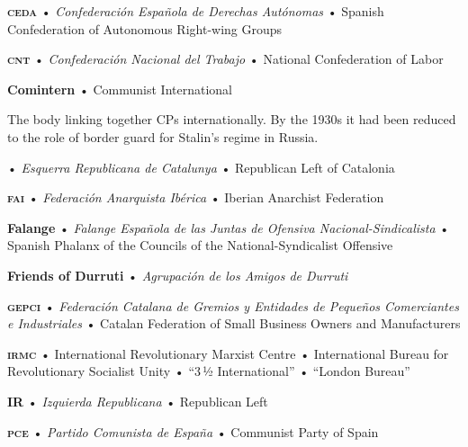 \begin{multicols}{2}
  \small
  \RaggedRight
  \setlength{\parskip}{0.25\baselineskip}
	
  \textbf{\textsc{ceda}} • \emph{Confederación Española de Derechas Autónomas} • Spanish Confederation of Autonomous Right-wing Groups
  
  \bigskip

  \textbf{\textsc{cnt}} • \emph{Confederación Nacional del Trabajo} • National Confederation of Labor

  \bigskip

  \textbf{Comintern} • Communist International

  The body linking together CPs internationally. By the 1930s it had been reduced to the role of border guard for Stalin’s regime in Russia.
  
  \bigskip

  \textbf{\ERC} • \emph{Esquerra Republicana de Catalunya} • Republican Left of Catalonia
  
  \bigskip
  
  \textbf{\textsc{fai}} • \emph{Federación Anarquista Ibérica} • Iberian Anarchist Federation
  
  \bigskip

  \textbf{Falange} • \emph{Falange Española de las Juntas de Ofensiva Nacional-Sindicalista} • Spanish Phalanx of the Councils of the National-Syndicalist Offensive
  
  \bigskip

  \textbf{Friends of Durruti} • \emph{Agrupación de los Amigos de Durruti}
  
  \bigskip

  \textbf{\textsc{gepci}} • \emph{Federación Catalana de Gremios y Entidades de Pequeños Comerciantes e Industriales} • Catalan Federation of Small Business Owners and Manufacturers
  
  \bigskip

  \textbf{\textsc{irmc}} • International Revolutionary Marxist Centre • International Bureau for Revolutionary Socialist Unity • “3\,½ International” • “London Bureau”
  
  \bigskip

  \textbf{IR} • \emph{Izquierda Republicana} • Republican Left

  \bigskip

  \textbf{\textsc{pce}} • \emph{Partido Comunista de España} • Communist Party of Spain
  
  \bigskip
  

\end{multicols}
